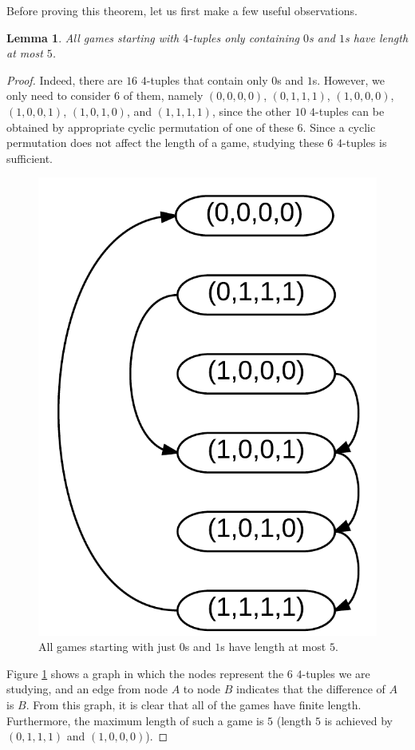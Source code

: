 \documentclass[12pt]{amsart}
\newtheorem{lemma}[theorem]{Lemma}
\begin{document}
Before proving this theorem, let us first make a few useful observations.

\begin{lemma}
All games starting with $4$-tuples only containing $0$s and $1$s have length at most $5$.
\label{lem:zerosones}
\end{lemma}

\begin{proof}
Indeed, there are $16$ $4$-tuples that contain only $0$s and $1$s. However, we only need to consider $6$ of them, namely $(0,0,0,0)$, $(0,1,1,1)$, $(1,0,0,0)$, $(1,0,0,1)$, $(1,0,1,0)$, and $(1,1,1,1)$, since the other $10$ $4$-tuples can be obtained by appropriate cyclic permutation of one of these $6$. Since a cyclic permutation does not affect the length of a game, studying these $6$ $4$-tuples is sufficient.

\begin{figure}
\includegraphics{number_squares_0s_and_1s.png}
\caption{All games starting with just $0$s and $1$s have length at most $5$.}
\label{fig:zerosones}
\end{figure}

Figure \ref{fig:zerosones} shows a graph in which the nodes represent the $6$ $4$-tuples we are studying, and an edge from node $A$ to node $B$ indicates that the difference of $A$ is $B$. From this graph, it is clear that all of the games have finite length. Furthermore, the maximum length of such a game is $5$ (length $5$ is achieved by $(0,1,1,1)$ and $(1,0,0,0)$).

\end{proof}
\end{document}
